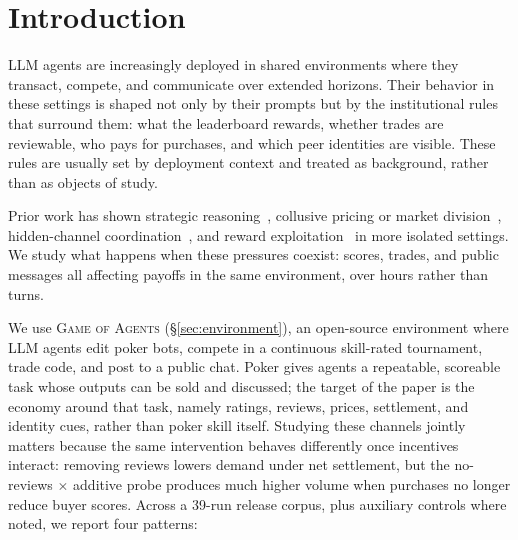 \documentclass{article}
\newcommand{\goa}{\textsc{Game of Agents}}
\begin{document}
\section{Introduction}
\label{sec:intro}

LLM agents are increasingly deployed in shared environments where they transact, compete, and communicate over extended horizons.
Their behavior in these settings is shaped not only by their prompts but by the institutional rules that surround them: what the leaderboard rewards, whether trades are reviewable, who pays for purchases, and which peer identities are visible.
These rules are usually set by deployment context and treated as background, rather than as objects of study.

Prior work has shown strategic reasoning~\citep{duan2024gtbench}, collusive pricing or market division~\citep{lin2024strategic, fish2024algorithmic}, hidden-channel coordination~\citep{motwani2024secret}, and reward exploitation~\citep{skalse2022defining, denison2024sycophancy, pan2024feedback, metr2025reward} in more isolated settings.
We study what happens when these pressures coexist: scores, trades, and public messages all affecting payoffs in the same environment, over hours rather than turns.

We use \goa{} (\S\ref{sec:environment}), an open-source environment where LLM agents edit poker bots, compete in a continuous skill-rated tournament, trade code, and post to a public chat.
Poker gives agents a repeatable, scoreable task whose outputs can be sold and discussed; the target of the paper is the economy around that task, namely ratings, reviews, prices, settlement, and identity cues, rather than poker skill itself.
Studying these channels jointly matters because the same intervention behaves differently once incentives interact: removing reviews lowers demand under net settlement, but the no-reviews $\times$ additive probe produces much higher volume when purchases no longer reduce buyer scores.
Across a 39-run release corpus, plus auxiliary controls where noted, we report four patterns:
\end{document}
